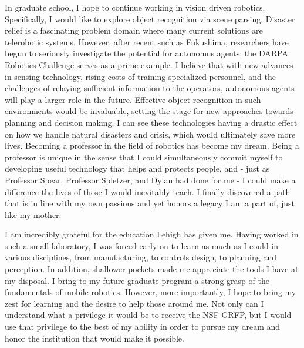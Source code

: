 \documentclass[10pt]{article}
\begin{document}
In graduate school, I hope to continue working in vision driven robotics.
Specifically, I would like to explore object recognition via scene parsing.
Disaster relief is a fascinating problem domain where many current solutions
are telerobotic systems. However, after recent such as Fukushima, researchers
have begun to seriously investigate the potential for autonomus agents; the
DARPA Robotics Challenge serves as a prime example. I believe that with new
advances in sensing technology, rising costs of training specialized personnel,
and the challenges of relaying sufficient information to the operators,
autonomous agents will play a larger role in the future. Effective object
recognition in such environments would be invaluable, setting the stage for new
approaches towards planning and decision making. I can see these technologies
having a drastic effect on how we handle natural disasters and crisis, which
would ultimately save more lives. Becoming a professor in the field of robotics
has become my dream. Being a professor is unique in the sense that I could
simultaneously commit myself to developing useful technology that helps and
protects people, and - just as Professor Spear, Professor Spletzer, and Dylan
had done for me - I could make a difference the lives of those I would
inevitably teach. I finally discovered a path that is in line with my own
passions and yet honors a legacy I am a part of, just like my mother.

I am incredibly grateful for the education Lehigh has given me. Having worked
in such a small laboratory, I was forced early on to learn as much as I could
in various disciplines, from manufacturing, to controls design, to planning and
perception. In addition, shallower pockets made me appreciate the tools I have
at my disposal. I bring to my future graduate program a strong grasp of the
fundamentals of mobile robotics. However, more importantly, I hope to bring my
zest for learning and the desire to help those around me. Not only can I
understand what a privilege it would be to receive the NSF GRFP, but I would
use that privilege to the best of my ability in order to pursue my dream and
honor the institution that would make it possible.
\end{document}
